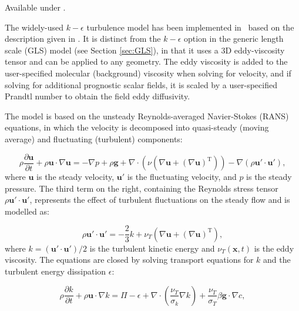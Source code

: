 Available under .

The widely-used $k-\epsilon$ turbulence model has been implemented in \fluidity\ based on the description given in
\citet{mathieu2000}. It is distinct from the $k-\epsilon$ option in the generic length scale (GLS) model (see
Section \ref{sec:GLS}), in that it uses a 3D eddy-viscosity tensor and can be applied to any geometry. The eddy viscosity is added to the user-specified molecular (background) viscosity when solving for velocity, and if solving for additional prognostic scalar fields, it is scaled by a user-specified Prandtl number to obtain the field eddy diffusivity.

The model is based on the unsteady Reynolds-averaged Navier-Stokes (RANS) equations, in which the velocity is decomposed into quasi-steady (moving average) and fluctuating (turbulent) components:

\begin{equation}\label{RANS}
\rho\frac{\partial \mathbf{u}}{\partial t} + \rho\mathbf{u}\cdot\nabla\mathbf{u} =
-\nabla p + \rho\mathbf{g} + \nabla\cdot\left(\nu(\nabla\mathbf{u} + (\nabla\mathbf{u})^{\mathrm{T}})\right) - \nabla\left(\rho\mathbf{u}'\cdot\mathbf{u}'\right),
\end{equation}
where $\mathbf{u}$ is the steady velocity, $\mathbf{u}'$ is the fluctuating velocity, and $p$ is the steady pressure.
The third term on the right, containing the Reynolds stress tensor $\rho\mathbf{u}'\cdot\mathbf{u}'$, represents the effect of turbulent fluctuations on the steady flow and is modelled as:

\begin{equation}\label{retens}
 \rho\mathbf{u}'\cdot\mathbf{u}' = - \frac{2}{3} k + \nu_T \left(\nabla\mathbf{u} + (\nabla\mathbf{u})^{\mathrm{T}}\right),
\end{equation}
where $k=(\mathbf{u}'\cdot\mathbf{u}')/2$ is the turbulent kinetic energy and $\nu_T(\mathbf{x},t)$ is the eddy viscosity.
The equations are closed by solving transport equations for $k$ and the turbulent energy dissipation $\epsilon$:

\begin{equation}\label{k}
\rho\frac{\partial k}{\partial t} + \rho\mathbf{u}\cdot\nabla k = \Pi - \epsilon + \nabla\cdot\left(\frac{\nu_T}{\sigma_k} \nabla k \right) + \frac{\nu_T}{\sigma_T} \beta \mathbf{g}\cdot\nabla c,
\end{equation}

